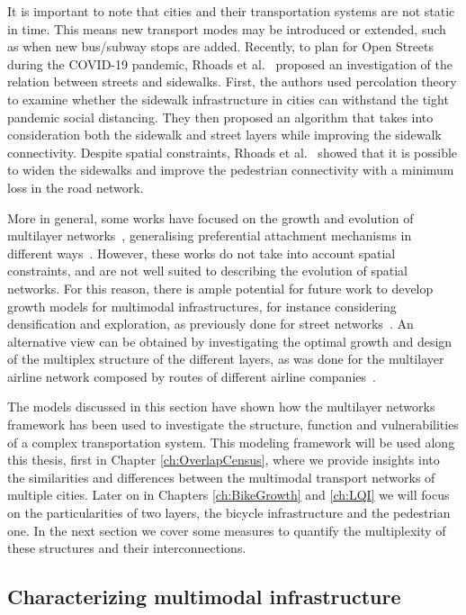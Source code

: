 It is important to note that cities and their transportation systems are not static in time. This means new transport modes may be introduced or extended, such as when new bus/subway stops are added. Recently, to plan for Open Streets during the COVID-19 pandemic, Rhoads et al.~\cite{rhoads2020planning} proposed an investigation of the relation between streets and sidewalks. First, the authors used percolation theory to examine whether the sidewalk infrastructure in cities can withstand the tight pandemic social distancing. They then proposed an algorithm that takes into consideration both the sidewalk and street layers while improving the sidewalk connectivity. Despite spatial constraints, Rhoads et al.~\cite{rhoads2020planning} showed that it is possible to widen the sidewalks and improve the pedestrian connectivity with a minimum loss in the road network. 

More in general, some works have focused on the growth and evolution of multilayer networks~\cite{nicosia2013growing,kim2013coevolution,nicosia2014nonlinear}, generalising preferential attachment mechanisms in different ways~\cite{barabasi1999emergence}. However, these works do not take into account spatial constraints, and are not well suited to describing the evolution of spatial networks. For this reason, there is ample potential for future work to develop growth models for multimodal infrastructures, for instance considering densification and exploration, as previously done for street networks~\cite{strano2012evolution}. An alternative view can be obtained by investigating the optimal growth and design of the multiplex structure of the different layers, as was done for the multilayer airline network composed by routes of different airline companies~\cite{santoro2018pareto}. 

The models discussed in this section have shown how the multilayer networks framework has been used to investigate the structure, function and vulnerabilities of a complex transportation system. This modeling framework will be used along this thesis, first in Chapter \ref{ch:OverlapCensus}, where we provide insights into the similarities and differences between the multimodal transport networks of multiple cities. Later on in Chapters \ref{ch:BikeGrowth} and \ref{ch:LQI} we will focus on the particularities of two layers, the bicycle infrastructure and the pedestrian one. In the next section we cover some measures to quantify the multiplexity of these structures and their interconnections.  

\subsection{Characterizing multimodal infrastructure}\label{sec:measuresinfrastructure}

